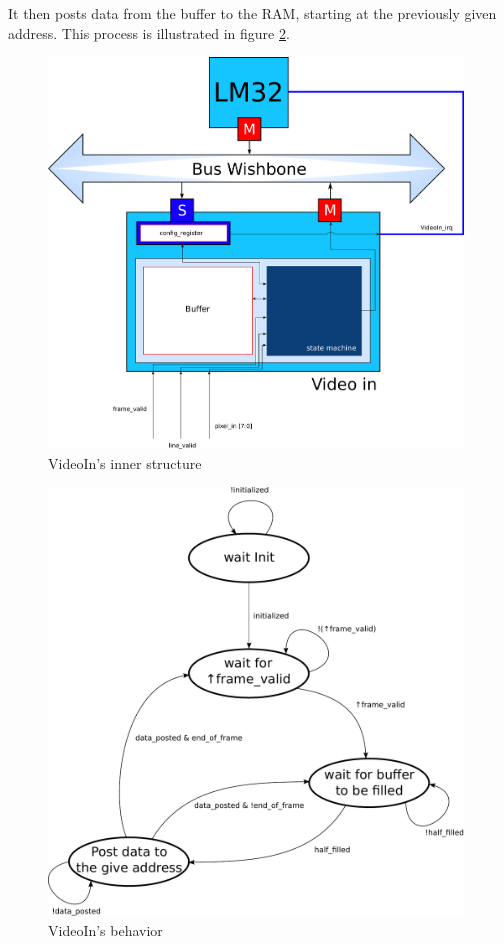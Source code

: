 It then posts data from the buffer to the RAM, starting at the previously given address. This process is illustrated in figure \ref{VideoIn_sm}.

\begin{figure}[h]
\center
\includegraphics[width=11cm]{figs/Video_In_blocks.pdf}
\caption{VideoIn's inner structure}
\label{VideoIn_struct}
\end{figure}


\begin{figure}[h]
\center
\includegraphics[width=11cm]{figs/video_in_sm.pdf}
\caption{VideoIn's behavior}
\label{VideoIn_sm}
\end{figure}

